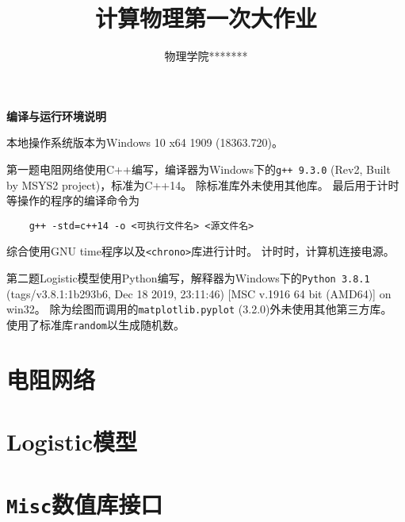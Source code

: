 \documentclass[a4paper,unicode]{report}
\title{计算物理第一次大作业}
\author{物理学院\quad ***\quad 18000*****}
\newcommand{\chapterendname}{章}
\begin{document}
\maketitle
\tableofcontents

\begin{center}
    \textbf{编译与运行环境说明}
\end{center}

本地操作系统版本为\textsf{Windows 10 x64 1909 (18363.720)}。

第一题电阻网络使用\textsf{C++}编写，编译器为Windows下的\texttt{g++ 9.3.0} (Rev2, Built by MSYS2 project)，标准为\textsf{C++14}。
除标准库外未使用其他库。
最后用于计时等操作的程序的编译命令为\begin{verbatim}
    g++ -std=c++14 -o <可执行文件名> <源文件名>
\end{verbatim}
综合使用\textsf{GNU time}程序以及\texttt{<chrono>}库进行计时。
计时时，计算机连接电源。

第二题Logistic模型使用\textsf{Python}编写，解释器为Windows下的\texttt{Python 3.8.1} (tags/v3.8.1:1b293b6, Dec 18 2019, 23:11:46) [MSC v.1916 64 bit (AMD64)] on win32。
除为绘图而调用的\texttt{matplotlib.pyplot} (3.2.0)外未使用其他第三方库。
使用了标准库\texttt{random}以生成随机数。

\chapter{电阻网络}


\chapter{Logistic模型}


\appendix
\renewcommand\chapterendname{}

\chapter{\texttt{Misc}数值库接口}

\end{document}
